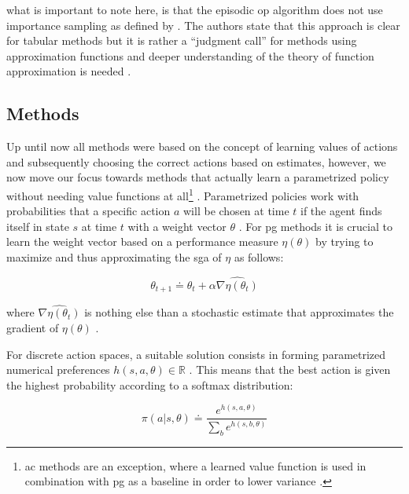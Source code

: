 what is important to note here, is that the episodic \gls{op} algorithm does not use importance sampling as defined by  \citep[p. 244]{Sutton2017}. The authors state that this approach is clear for tabular methods but it is rather a ``judgment call'' for methods using approximation functions and deeper understanding of the theory of function approximation is needed \citep[p. 244]{Sutton2017}.

\subsection{ Methods}
\label{subsec:polgrad_methods}

Up until now all methods were based on the concept of learning values of actions and subsequently choosing the correct actions based on estimates, however, we now move our focus towards methods that actually learn a parametrized policy without needing value functions at all\footnote{\gls{ac} methods are an exception, where a learned value function is used in combination with \gls{pg} as a baseline in order to lower variance \citep{Sutton2017}.}  \citep[p. 265]{Sutton2017}. Parametrized policies work with probabilities that a specific action $a$ will be chosen at time $t$ if the agent finds itself in state $s$ at time $t$ with a weight vector $\theta$ \citep[p. 265]{Sutton2017}. For \gls{pg} methods it is crucial to learn the weight vector based on a performance measure $\eta(\theta)$ by trying to maximize and thus approximating the \gls{sga} of $\eta$ as follows:

\begin{equation}
	\theta_{t+1} \doteq \theta_t + \alpha \widehat{\nabla \eta (\theta_t)}
\end{equation}

where $ \widehat{\nabla \eta (\theta_t)}$ is nothing else than a stochastic estimate that approximates the gradient of $\eta(\theta)$ \citep[p. 265]{Sutton2017}.

For discrete action spaces, a suitable solution consists in forming parametrized numerical preferences $h(s,a,\theta) \in \mathbb{R}$ \citep[p. 266]{Sutton2017}. This means that the best action is given the highest probability according to a softmax distribution:

\begin{equation}
\label{eq:probabilistic_preferences}
	\pi(a|s,\theta) \doteq \frac{e^{h(s,a,\theta)}}{\sum_b e^{h(s,b,\theta)}}
\end{equation}

